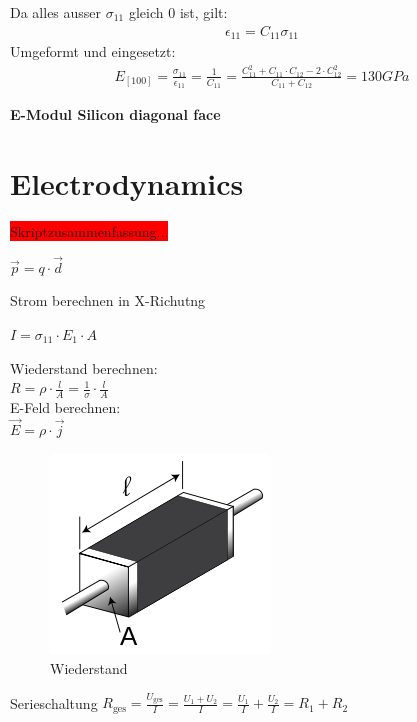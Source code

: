 \documentclass[a4paper]{scrartcl}
\begin{document}
Da alles ausser $\sigma_{11}$ gleich 0 ist, gilt:
\begin{align}
\epsilon_{11} = C_{11} \sigma_{11}
\end{align}
Umgeformt und eingesetzt:
\begin{align}
E_{[100]} = \frac{\sigma_{11}}{\epsilon_{11}} = \frac{1}{C_{11}} =
\frac{C_{11}^2 + C_{11} \cdot C_{12} - 2 \cdot C_{12}^2}{C_{11} + C_{12}} = 130
GPa
\end{align}


\textbf{E-Modul Silicon diagonal face}\\




\section{Electrodynamics}

\colorbox{red}{Skriptzusammenfassung...}

$ \vec{p}=q\cdot\vec{d} $


Strom berechnen in X-Richutng

$ I = \sigma_{11} \cdot E_1 \cdot A $


Wiederstand berechnen:\\
$ R=\rho\cdot\frac{l}{A}=\frac{1}{\sigma} \cdot\frac{l}{A}$\\

E-Feld berechnen:\\
$ \vec E = \rho \cdot \vec j $\\


\begin{figure}[h!]
\begin{center}
\includegraphics[scale=0.5]{images/Wiederstand.png}
\caption{Wiederstand}
\label{fig:Wiederstand}
\end{center}
\end{figure}

Serieschaltung
$R_\mathrm{ges} = \frac{U_\mathrm{ges}}{I} = \frac{U_1 + U_2}{I} = \frac{U_1}{I} + \frac{U_2}{I} = R_1 + R_2 $
\end{document}
